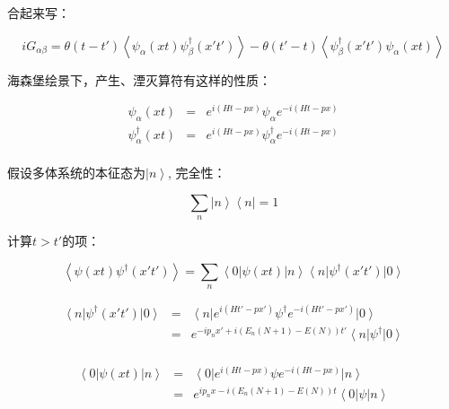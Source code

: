 合起来写：

\begin{equation}
iG_{\alpha \beta} = \theta(t - t') \left\langle \psi_\alpha(xt) \psi_\beta^\dagger(x't')   \right\rangle - \theta(t' - t) \left\langle  \psi_\beta^\dagger(x't')    \psi_\alpha(xt)   \right\rangle
\end{equation}

海森堡绘景下，产生、湮灭算符有这样的性质：

\begin{eqnarray*}
\psi_\alpha (xt) &=& e^{i(Ht - px)} \psi_\alpha  e^{-i(Ht - px)}\\
\psi_{\alpha}^{\dagger} (xt) &=&  e^{i(Ht - px)} \psi_{\alpha}^{\dagger}  e^{-i(Ht - px)} \\
\end{eqnarray*}

假设多体系统的本征态为$\left| n \right\rangle$, 完全性：

\begin{equation*}
\sum\limits_n \left| n \right\rangle \left\langle n \right| = 1
\end{equation*}

计算$t > t' $的项：

\begin{equation*}
\left\langle \psi (xt) \psi^\dagger (x't') \right\rangle =  \sum\limits_n \left\langle 0 \right| \psi(xt) \left| n \right\rangle \left\langle n \right| \psi^\dagger(x't') \left| 0 \right\rangle
\end{equation*}

\begin{eqnarray*}
\left\langle n \right| \psi^\dagger(x't') \left| 0 \right\rangle  &=&   \left\langle n \right|  e^{i(Ht' - px')}  \psi^\dagger  e^{ - i(Ht' - px')}  \left| 0 \right\rangle \\
{} &=& e^{-ip_n x' + i (E_n(N+1) - E(N))t'} \left\langle n \right| \psi^\dagger \left| 0 \right\rangle \\
\end{eqnarray*}

\begin{eqnarray*}
\left\langle 0 \right| \psi(xt) \left| n \right\rangle &=& \left\langle 0 \right|  e^{i(Ht - px)}  \psi  e^{ - i(Ht - px)}  \left| n \right\rangle   \\
{} &=& e^{i p_n x - i (E_n (N+1) - E(N)) t } \left\langle 0 \right| \psi \left| n \right\rangle  \\
\end{eqnarray*}

